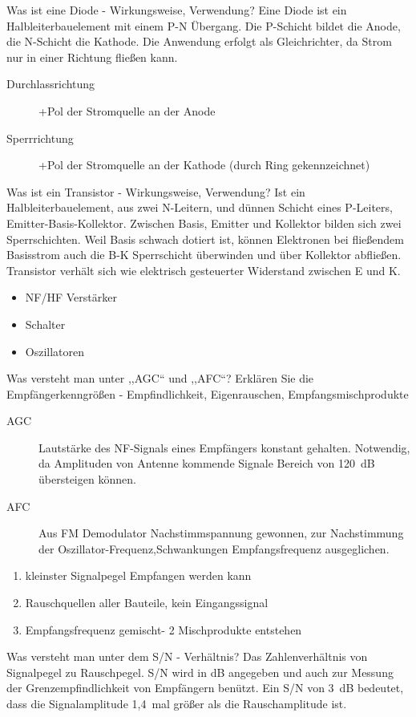 \documentclass[avery5371,grid,frame,a4paper]{flashcards}
\newcommand{\card}[3]{
  \begin{flashcard}[{\chap} -- #1]{#2}#3\end{flashcard}
}
\begin{document}
\card{22}{Was ist eine Diode - Wirkungsweise, Verwendung?}{
  Eine Diode ist ein Halbleiterbauelement mit einem P-N Übergang. Die P-Schicht bildet die Anode, die N-Schicht die Kathode. Die Anwendung erfolgt als Gleichrichter, da Strom nur in einer Richtung fließen kann.
  \begin{description}
    \item[Durchlassrichtung] +Pol der Stromquelle an der Anode
    \item[Sperrrichtung] +Pol der Stromquelle an der Kathode (durch Ring gekennzeichnet)
  \end{description}
}
\card{23}{Was ist ein Transistor - Wirkungsweise, Verwendung?}{
  \small
  Ist ein Halbleiterbauelement, aus zwei N-Leitern, und dünnen Schicht eines P-Leiters, Emitter-Basis-Kollektor. Zwischen Basis, Emitter und Kollektor bilden sich zwei Sperrschichten. Weil Basis schwach dotiert ist, können Elektronen bei fließendem Basisstrom auch die B-K Sperrschicht überwinden und über Kollektor abfließen. Transistor verhält sich wie elektrisch gesteuerter Widerstand zwischen E und K.

  \begin{itemize}\itemsep-1pt
    \item NF/HF Verstärker
    \item Schalter
    \item Oszillatoren
  \end{itemize}
}
\card{24}{Was versteht man unter ,,AGC`` und ,,AFC``? Erklären Sie die Empfängerkenngrößen - Empfindlichkeit, Eigenrauschen, Empfangsmischprodukte}{
  \footnotesize
  \begin{description}
    \item[AGC] Lautstärke des NF-Signals eines Empfängers konstant gehalten. Notwendig, da Amplituden von Antenne kommende Signale Bereich von \SI{120}{\dB} übersteigen können.
    \item[AFC] Aus FM Demodulator Nachstimmspannung gewonnen, zur Nachstimmung der Oszillator-Frequenz,Schwankungen Empfangsfrequenz ausgeglichen.
  \end{description}
  \begin{enumerate}
    \item kleinster Signalpegel Empfangen werden kann
    \item Rauschquellen aller Bauteile, kein Eingangssignal
    \item Empfangsfrequenz gemischt- 2 Mischprodukte entstehen
  \end{enumerate}
}
\card{26}{Was versteht man unter dem S/N - Verhältnis?}{
  Das Zahlenverhältnis von Signalpegel zu Rauschpegel. S/N wird in dB angegeben und auch zur Messung der Grenzempfindlichkeit von Empfängern benützt.
  Ein S/N von 3~dB bedeutet, dass die Signalamplitude 1,4~mal größer als die Rauschamplitude ist.
}
\end{document}
